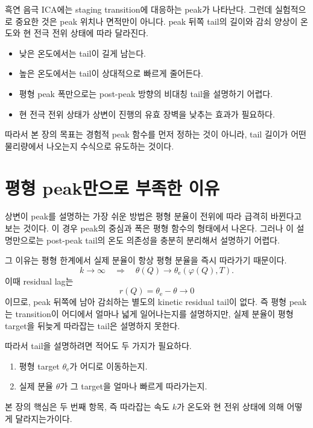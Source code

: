 \documentclass[11pt]{article}
\begin{document}
흑연 음극 ICA에는 staging transition에 대응하는 peak가 나타난다. 그런데 실험적으로 중요한 것은 peak 위치나 면적만이 아니다. peak 뒤쪽 tail의 길이와 감쇠 양상이 온도와 현 전극 전위 상태에 따라 달라진다.

\begin{itemize}
\item 낮은 온도에서는 tail이 길게 남는다.
\item 높은 온도에서는 tail이 상대적으로 빠르게 줄어든다.
\item 평형 peak 폭만으로는 post-peak 방향의 비대칭 tail을 설명하기 어렵다.
\item 현 전극 전위 상태가 상변이 진행의 유효 장벽을 낮추는 효과가 필요하다.
\end{itemize}

따라서 본 장의 목표는 경험적 peak 함수를 먼저 정하는 것이 아니라, tail 길이가 어떤 물리량에서 나오는지 수식으로 유도하는 것이다.

\section{평형 peak만으로 부족한 이유}

상변이 peak를 설명하는 가장 쉬운 방법은 평형 분율이 전위에 따라 급격히 바뀐다고 보는 것이다. 이 경우 peak의 중심과 폭은 평형 함수의 형태에서 나온다. 그러나 이 설명만으로는 post-peak tail의 온도 의존성을 충분히 분리해서 설명하기 어렵다.

그 이유는 평형 한계에서 실제 분율이 항상 평형 분율을 즉시 따라가기 때문이다.
\begin{equation}
k\rightarrow\infty
\quad\Longrightarrow\quad
\theta(Q)\rightarrow\theta_{\mathrm e}(\varphi(Q),T).
\end{equation}
이때 residual lag는
\begin{equation}
r(Q)=\theta_{\mathrm e}-\theta\rightarrow0
\end{equation}
이므로, peak 뒤쪽에 남아 감쇠하는 별도의 kinetic residual tail이 없다. 즉 평형 peak는 transition이 어디에서 얼마나 넓게 일어나는지를 설명하지만, 실제 분율이 평형 target을 뒤늦게 따라잡는 tail은 설명하지 못한다.

따라서 tail을 설명하려면 적어도 두 가지가 필요하다.
\begin{enumerate}
\item 평형 target \(\theta_{\mathrm e}\)가 어디로 이동하는지.
\item 실제 분율 \(\theta\)가 그 target을 얼마나 빠르게 따라가는지.
\end{enumerate}
본 장의 핵심은 두 번째 항목, 즉 따라잡는 속도 \(k\)가 온도와 현 전위 상태에 의해 어떻게 달라지는가이다.
\end{document}
